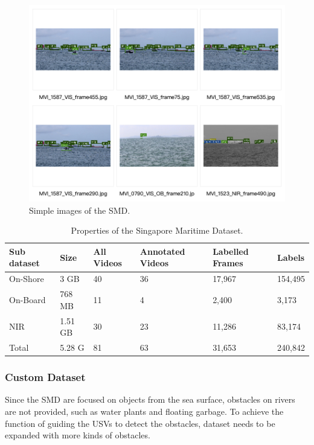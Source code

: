 \documentclass[journal,article,submit,moreauthors,pdftex]{Definitions/mdpi}
\begin{document}
\begin{figure}[htbp]
\centering
\includegraphics[width=0.9\columnwidth]{images/SMD-example.png}
\caption{Simple images of the SMD.}
\label{fig:Simple images of the SMD}
\end{figure}

\begin{table}[htbp]
\centering
\caption{Properties of the Singapore Maritime Dataset.}
\begin{tabular}{llllll} 
\toprule
\textbf{Sub dataset}&\textbf{Size}&\textbf{All Videos}&\textbf{Annotated Videos}&\textbf{Labelled Frames}& \textbf{Labels}\\
\midrule
On-Shore & 3 GB& 40 & 36 & 17,967& 154,495\\
On-Board & 768 MB&  11 &4 &2,400& 3,173\\
NIR& 1.51 GB&  30&23 & 11,286& 83,174\\
\cmidrule(r){1-6}
Total& 5.28 G&  81 &63 & 31,653 &240,842\\
\bottomrule
\end{tabular}
\label{tbl:Properties of Singapore Maritime Dataset}
\end{table}


\subsubsection{Custom Dataset}

Since the SMD are focused on objects from the sea surface, obstacles on rivers are not provided, such as water plants and floating garbage. To achieve the function of guiding the USVs to detect the obstacles, dataset needs to be expanded with more kinds of obstacles.
\end{document}
